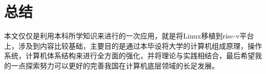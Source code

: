 \section{总结}
本文仅仅是利用本科所学知识来进行的一次应用，就是将Linux移植到risc-v平台上，涉及到内容比较基础，主要目的是通过本毕设将大学的计算机组成原理，操作系统，计算机体系结构来进行全方面的强化，并将理论与实践相结合，最后希望我的一点探索努力可以更好的完善我国在计算机底层领域的长足发展。

